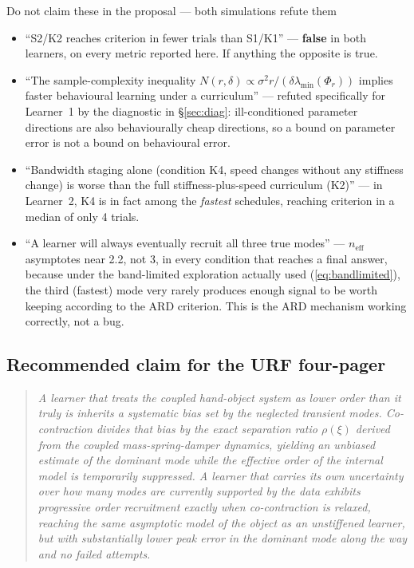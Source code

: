 \documentclass[11pt,a4paper]{article}
\newcommand{\neff}{n_{\mathrm{eff}}}
\begin{document}
\begin{warnbox}{Do not claim these in the proposal --- both simulations refute them}
\begin{itemize}[nosep]
\item ``S2/K2 reaches criterion in fewer trials than S1/K1'' --- \textbf{false}
  in both learners, on every metric reported here. If anything the opposite is
  true.
\item ``The sample-complexity inequality $N(r,\delta)\propto\sigma^2r/(\delta\lambda_{\min}(\Phi_r))$ implies
  faster behavioural learning under a curriculum'' --- refuted specifically
  for Learner~1 by the diagnostic in \S\ref{sec:diag}: ill-conditioned
  parameter directions are also behaviourally cheap directions, so a bound on
  parameter error is not a bound on behavioural error.
\item ``Bandwidth staging alone (condition K4, speed changes without any
  stiffness change) is worse than the full stiffness-plus-speed curriculum
  (K2)'' --- in Learner~2, K4 is in fact among the \emph{fastest} schedules,
  reaching criterion in a median of only 4 trials.
\item ``A learner will always eventually recruit all three true modes''
  --- $\neff$ asymptotes near 2.2, not 3, in every condition that reaches a
  final answer, because under the band-limited exploration actually used
  (\eqref{eq:bandlimited}), the third (fastest) mode very rarely produces
  enough signal to be worth keeping according to the ARD criterion. This is
  the ARD mechanism working correctly, not a bug.
\end{itemize}
\end{warnbox}

\subsection{Recommended claim for the URF four-pager}

\begin{quote}
\emph{A learner that treats the coupled hand-object system as lower order than
it truly is inherits a systematic bias set by the neglected transient modes.
Co-contraction divides that bias by the exact separation ratio $\rho(\xi)$
derived from the coupled mass-spring-damper dynamics, yielding an unbiased
estimate of the dominant mode while the effective order of the internal model
is temporarily suppressed. A learner that carries its own uncertainty over how
many modes are currently supported by the data exhibits progressive order
recruitment exactly when co-contraction is relaxed, reaching the same
asymptotic model of the object as an unstiffened learner, but with
substantially lower peak error in the dominant mode along the way and no
failed attempts.}
\end{quote}
\end{document}
